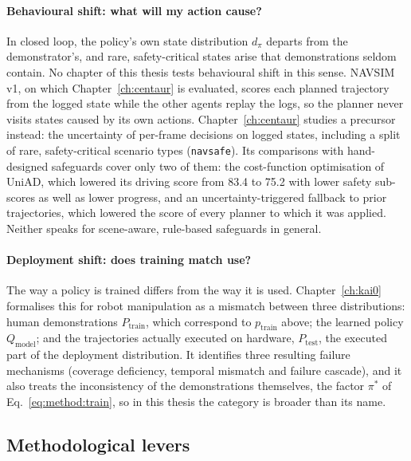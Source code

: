 \paragraph{Behavioural shift: what will my action cause?} In closed loop, the policy's own state distribution $d_{\pi}$ departs from the demonstrator's, and rare, safety-critical states arise that demonstrations seldom contain. No chapter of this thesis tests behavioural shift in this sense. NAVSIM v1, on which Chapter~\ref{ch:centaur} is evaluated, scores each planned trajectory from the logged state while the other agents replay the logs, so the planner never visits states caused by its own actions. Chapter~\ref{ch:centaur} studies a precursor instead: the uncertainty of per-frame decisions on logged states, including a split of rare, safety-critical scenario types (\texttt{navsafe}). Its comparisons with hand-designed safeguards cover only two of them: the cost-function optimisation of UniAD, which lowered its driving score from 83.4 to 75.2 with lower safety sub-scores as well as lower progress, and an uncertainty-triggered fallback to prior trajectories, which lowered the score of every planner to which it was applied. Neither speaks for scene-aware, rule-based safeguards in general.

\paragraph{Deployment shift: does training match use?} The way a policy is trained differs from the way it is used. Chapter~\ref{ch:kai0} formalises this for robot manipulation as a mismatch between three distributions: human demonstrations $P_{\mathrm{train}}$, which correspond to $p_{\mathrm{train}}$ above; the learned policy $Q_{\mathrm{model}}$; and the trajectories actually executed on hardware, $P_{\mathrm{test}}$, the executed part of the deployment distribution. It identifies three resulting failure mechanisms (coverage deficiency, temporal mismatch and failure cascade), and it also treats the inconsistency of the demonstrations themselves, the factor $\pi^{*}$ of Eq.~\eqref{eq:method:train}, so in this thesis the category is broader than its name.

\subsection{Methodological levers}

